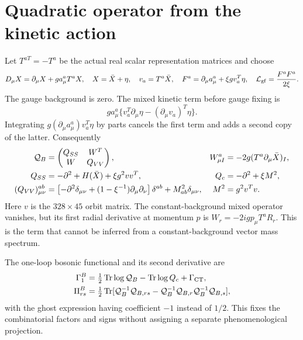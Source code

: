 \documentclass[11pt]{article}
\newcommand{\Tr}{\operatorname{Tr}}
\begin{document}
\section{Quadratic operator from the kinetic action}
Let $T^{aT}=-T^a$ be the actual real scalar representation matrices and
choose
\begin{equation}
 D_\mu X=\partial_\mu X+g a_\mu^aT^aX,\quad X=\bar X+\eta,\quad
 v_a=T^a\bar X,\quad
 F^a=\partial_\mu a_\mu^a+\xi g v_a^T\eta,\quad
 {\cal L}_{\rm gf}=\frac{F^aF^a}{2\xi}.
\end{equation}
The gauge background is zero. The mixed kinetic term before gauge fixing is
\[
 g a_\mu^a\{v_a^T\partial_\mu\eta
                -(\partial_\mu v_a)^T\eta\}.
\]
Integrating $g(\partial_\mu a_\mu^a)v_a^T\eta$ by parts cancels
the first term and adds a second copy of the latter. Consequently
\begin{align}
 {\cal Q}_B&=\begin{pmatrix}Q_{SS}&W^T\\W&Q_{VV}\end{pmatrix},
 &W^a_{\mu I}&=-2g(T^a\partial_\mu\bar X)_I,\\
 Q_{SS}&=-\partial^2+H(\bar X)+\xi g^2vv^T,&
 Q_c&=-\partial^2+\xi M^2,\\
 (Q_{VV})^{ab}_{\mu\nu}
 &=\left[-\partial^2\delta_{\mu\nu}
 +(1-\xi^{-1})\partial_\mu\partial_\nu\right]\delta^{ab}
 +M^2_{ab}\delta_{\mu\nu},&
 M^2&=g^2v^Tv.
\end{align}
Here $v$ is the $328\times45$ orbit matrix. The constant-background
mixed operator vanishes, but its first radial derivative at momentum
$p$ is $W_r=-2igp_\mu T^aR_r$. This is the term that cannot be inferred
from a constant-background vector mass spectrum.

The one-loop bosonic functional and its second derivative are
\begin{align}
 \Gamma_1^B&=\tfrac12\Tr\log{\cal Q}_B-\Tr\log Q_c+\Gamma_{\rm CT},\\
 \Pi^B_{rs}
 &=\tfrac12\Tr[{\cal Q}_B^{-1}{\cal Q}_{B,rs}
       -{\cal Q}_B^{-1}{\cal Q}_{B,r}{\cal Q}_B^{-1}{\cal Q}_{B,s}],
\end{align}
with the ghost expression having coefficient $-1$ instead of $1/2$.
This fixes the combinatorial factors and signs without assigning a
separate phenomenological projection.
\end{document}
